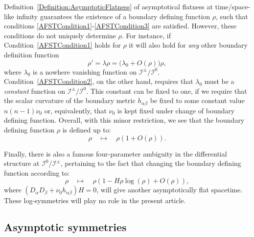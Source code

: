 \documentclass[a4paper, 10pt]{article}
\theoremstyle{remark}
\begin{document}
\noindent Definition~\ref{Definition:AsymptoticFlatness} of asymptotical flatness at time/space-like infinity guarantees the existence of a boundary defining function $\rho$, such that conditions \ref{AFSTCondition1}-\ref{AFSTCondition3} are satisfied. However, these conditions do not uniquely determine $\rho$. For instance, if Condition~\ref{AFSTCondition1} holds for $\rho$ it will also hold for \emph{any} other boundary definition function 
\begin{equation*}
    \rho' = \lambda \rho = \big(\lambda_0 + O(\rho)\big) \rho,
\end{equation*}
where $\lambda_0$ is a nowhere vanishing function on $\mathcal{I}^{\pm}/\mathcal{I}^{0}$. Condition~\ref{AFSTCondition2}, on the other hand, requires that $\lambda_0$ must be a \emph{constant} function on $\mathcal{I}^{\pm}/\mathcal{I}^{0}$. This constant can be fixed to one, if we require that the scalar curvature of the boundary metric $h_{\alpha \beta}$ be fixed to some constant value $n(n-1)\nu_0$ or, equivalently, that $\nu_0$ is kept fixed under change of boundary defining function.
Overall, with this minor restriction, we see that the boundary defining function $\rho$ is defined up to:
\begin{equation}
   \rho \quad \mapsto \quad \rho(1 + O(\rho)). 
\end{equation}

Finally, there is also a famous four-parameter ambiguity \cite{beig_einsteins_1982,Chrusciel:1989ye} in the differential structure at $\mathcal{I}^0$/$\mathcal{I}^\pm$, pertaining to the fact that changing the boundary defining function according to:
\begin{equation}
   \rho \quad \mapsto \quad \rho(1 -H \rho\log(\rho) + O(\rho)),
\end{equation}
where $(D_{\alpha}D_{\beta} +\nu_0 h_{\alpha \beta} )H=0$, will give another asymptotically flat spacetime. These log-symmetries will play no role in the present article.

\subsection{Asymptotic symmetries}
\end{document}
